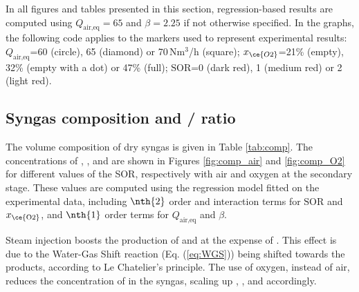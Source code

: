 In all figures and tables presented in this section, regression-based results are computed using $Q_\text{air,eq}=65$ and $\beta=2.25$ if not otherwise specified. In the graphs, the following code applies to the markers used to represent experimental results: $Q_\text{air,eq}$=60 (circle), 65 (diamond) or 70\,Nm$^3$/h (square); $x_{\ce{O2}}$=21\% (empty), 32\% (empty with a dot) or 47\% (full); $\mathrm{SOR}$=0 (dark red), 1 (medium red) or 2 (light red).


\subsection{Syngas composition and / ratio}
\label{sec:comp}

The volume composition of dry syngas is given in Table \ref{tab:comp}. The concentrations of , ,  and  are shown in Figures \ref{fig:comp_air} and \ref{fig:comp_O2} for different values of the SOR, respectively with air and oxygen at the secondary stage. These values are computed using the regression model fitted on the experimental data, including $\nth{2}$ order and interaction terms for $\mathrm{SOR}$ and $x_\mathrm{\ce{O2}}$, and $\nth{1}$ order terms for $Q_\text{air,eq}$ and $\beta$.

Steam injection boosts the production of  and  at the expense of . This effect is due to the Water-Gas Shift reaction (Eq. (\ref{eq:WGS})) being shifted towards the products, according to Le Chatelier's principle. The use of oxygen, instead of air, reduces the concentration of  in the syngas, scaling up , ,  and  accordingly.

